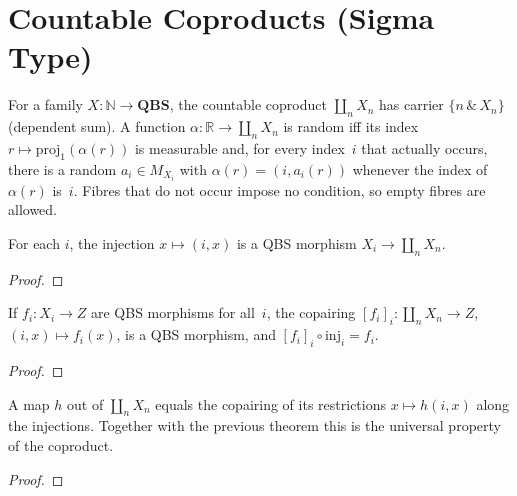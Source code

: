 \section{Countable Coproducts (Sigma Type)}\label{sec:gen_coproducts}

\begin{definition}\label{def:sigmaQ}
  \rocqok
  For a family $X : \mathbb{N} \to \mathbf{QBS}$, the countable coproduct
  $\coprod_{n} X_n$ has carrier $\{n \,\&\, X_n\}$ (dependent sum).
  A function $\alpha : \mathbb{R} \to \coprod_n X_n$ is random iff its
  index $r \mapsto \mathrm{proj}_1(\alpha(r))$ is measurable and, for every
  index~$i$ that actually occurs, there is a random $a_i \in M_{X_i}$ with
  $\alpha(r) = (i, a_i(r))$ whenever the index of $\alpha(r)$ is~$i$.
  Fibres that do not occur impose no condition, so empty fibres are allowed.
\end{definition}

\begin{lemma}[Injections]\label{lem:qbs_morphism_sigma_inj}
  \rocqok
  For each $i$, the injection $x \mapsto (i, x)$ is a QBS morphism
  $X_i \to \coprod_n X_n$.
\end{lemma}
\begin{proof}\rocqok\end{proof}

\begin{theorem}[Copairing]\label{thm:qbs_morphism_sigma_case}
  \rocqok
  If $f_i : X_i \to Z$ are QBS morphisms for all~$i$, the copairing
  $[f_i]_i : \coprod_n X_n \to Z$, $(i, x) \mapsto f_i(x)$, is a QBS
  morphism, and $[f_i]_i \circ \mathrm{inj}_i = f_i$.
\end{theorem}
\begin{proof}\rocqok\end{proof}

\begin{lemma}\label{lem:sigma_case_eta}
  \rocqok
  A map $h$ out of $\coprod_n X_n$ equals the copairing of its
  restrictions $x \mapsto h(i, x)$ along the injections.
  Together with the previous theorem this is the universal property of the
  coproduct.
\end{lemma}
\begin{proof}\rocqok\end{proof}


